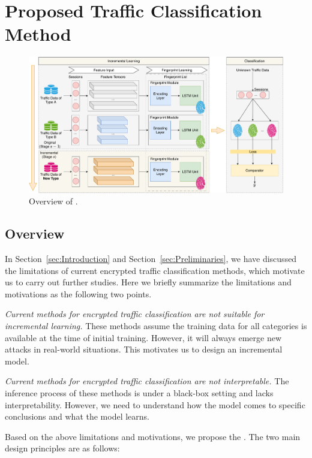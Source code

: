 \section{Proposed Traffic Classification Method}
\label{sec:Proposed_Traffic_Classification_Method}
\begin{figure}[htbp]
	\centering
	\includegraphics[scale=0.45]{figs/overview_of_model.pdf}
	\caption{Overview of \sys.}
	\label{fig:overview_of_model}
\end{figure}

\subsection{Overview}
In Section~\ref{sec:Introduction} and Section~\ref{sec:Preliminaries}, we have discussed the limitations of current encrypted traffic classification methods, which motivate us to carry out further studies.
Here we briefly summarize the limitations and motivations as the following two points. 

\first \textit{Current methods for encrypted traffic classification are not suitable for incremental learning.} 
These methods assume the training data for all categories is available at the time of initial training. 
However, it will always emerge new attacks in real-world situations. 
This motivates us to design an incremental model.

\second \textit{Current methods for encrypted traffic classification are not interpretable.} 
The inference process of these methods is under a black-box setting and lacks interpretability. 
However, we need to understand how the model comes to specific conclusions and 
what the model learns.

Based on the above limitations and motivations, we propose the \sys. 
The two main design principles are as follows:

